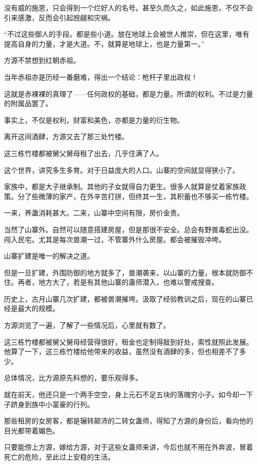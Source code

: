 \begin{this_body}
没有威的施恩，只会得到一个烂好人的名号。甚至久而久之，如此施恩，不仅不会引来感激，反而会引起觊觎和灾祸。

“不过这些御人的手段。都是些小道。放在地球上会被世人推崇，但在这里，唯有提高自身的力量，才是大道。不，就算是地球上，也是力量第一。”

方源不禁想到红朝赤祖。

当年赤祖亦是历经一番磨难，得出一个结论：枪杆子里出政权！

这就是赤裸裸的真理了——任何政权的基础，都是力量。所谓的权利。不过是力量的附属品罢了。

事实上，不仅是权利，财富和美色，亦都是力量的衍生物。

离开这间酒肆，方源又去了那三处竹楼。

这三栋竹楼都被舅父舅母租了出去，几乎住满了人。

这个世界，讲究多生多育。对于日益庞大的人口。山寨的空间就显得狭小了。

家族中，都是大子继承制。其他的子女就得自力更生。很多人就算是仗着家族政策。分了些微薄的家产，在外辛苦打拼，但终其一生，其积蓄也不够买一栋竹楼。

一来，养蛊消耗甚大。二来，山寨中空间有限，房价金贵。

当然了山寨外。自然可以随意搭建房屋，但是那很不安全。总会有野兽毒蛇出没。闯入民宅。尤其是每次兽潮一过，不管寨外什么房屋。都会被摧毁冲垮。

山寨扩建是唯一的解决之道。

但是一旦扩建，外围防御的地方就多了，兽潮袭来，以山寨的力量，根本就防御不住。再者，地方大了，若是有其他山寨的蛊师潜入，也难以警戒搜查。

历史上，古月山寨几次扩建，都被兽潮摧垮。汲取了经验教训之后，现在的山寨已经是最大的规模。

方源浏览了一遍，了解了一些情况后，心里就有数了。

这三栋竹楼都被舅父舅母经营得很好，租金也定制得敲到好处，索性就照此发展。他算了一下，这三栋竹楼给他带来的收益，虽然没有酒肆的多，但也相差不了多少。

总体情况，比方源原先料想的，要乐观得多。

就在前天，他还只是一个两手空空，身上元石不足五块的落魄穷小子。如今却一下子跻身到族中小富豪的行列。

那些租房的女房客，都是辗转颠沛的二转女蛊师，得知了方源的身份后，看向他的目光都带着媚色。

只要能傍上方源，嫁给方源，对于这些女蛊师来讲，今后也就不用在外奔波，冒着死亡的危险，至此过上安稳的生活。


\end{this_body}
